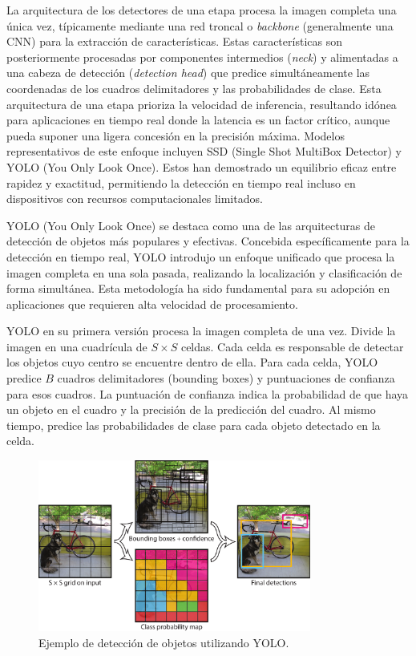 \documentclass[11pt,spanish,listoffigures,listoftables]{tfgetsinf}
\begin{document}
La arquitectura de los detectores de una etapa procesa la imagen completa una única vez, típicamente mediante una red troncal o \textit{backbone} (generalmente una CNN) para la extracción de características. Estas características son posteriormente procesadas por componentes intermedios (\textit{neck}) y alimentadas a una cabeza de detección (\textit{detection head}) que predice simultáneamente las coordenadas de los cuadros delimitadores y las probabilidades de clase. 
Esta arquitectura de una etapa prioriza la velocidad de inferencia, resultando idónea para aplicaciones en tiempo real donde la latencia es un factor crítico, aunque pueda suponer una ligera concesión en la precisión máxima. Modelos representativos de este enfoque incluyen SSD (Single Shot MultiBox Detector)\cite{Liu_2016} y YOLO (You Only Look Once)\cite{redmon2016lookonceunifiedrealtime}. Estos han demostrado un equilibrio eficaz entre rapidez y exactitud, permitiendo la detección en tiempo real incluso en dispositivos con recursos computacionales limitados.

YOLO (You Only Look Once) se destaca como una de las arquitecturas de detección de objetos más populares y efectivas. Concebida específicamente para la detección en tiempo real, YOLO introdujo un enfoque unificado que procesa la imagen completa en una sola pasada, realizando la localización y clasificación de forma simultánea. Esta metodología ha sido fundamental para su adopción en aplicaciones que requieren alta velocidad de procesamiento.

YOLO en su primera versión procesa la imagen completa de una vez. Divide la imagen en una cuadrícula de $S \times S$ celdas. Cada celda es responsable de detectar los objetos cuyo centro se encuentre dentro de ella. Para cada celda, YOLO predice $B$ cuadros delimitadores (bounding boxes) y puntuaciones de confianza para esos cuadros. La puntuación de confianza indica la probabilidad de que haya un objeto en el cuadro y la precisión de la predicción del cuadro. Al mismo tiempo, predice las probabilidades de clase para cada objeto detectado en la celda.

\begin{figure}[H]
   \centering
   \includegraphics[width=0.8\textwidth]{images/estado_del_arte/yolo_detections_example.png}
   \caption{Ejemplo de detección de objetos utilizando YOLO.}
   \label{fig:yolo_detections_example}
\end{figure}
\end{document}
